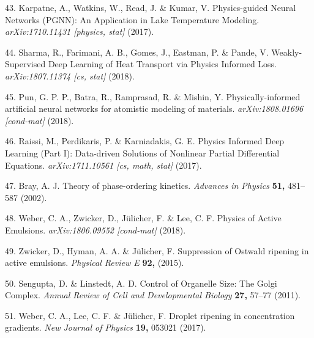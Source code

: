 \documentclass{Dissertate}
\begin{document}
\leavevmode\hypertarget{ref-karpatne_physics-guided_2017}{}%
43. Karpatne, A., Watkins, W., Read, J. \& Kumar, V. Physics-guided
Neural Networks (PGNN): An Application in Lake Temperature Modeling.
\emph{arXiv:1710.11431 {[}physics, stat{]}} (2017).

\leavevmode\hypertarget{ref-sharma_weakly-supervised_2018}{}%
44. Sharma, R., Farimani, A. B., Gomes, J., Eastman, P. \& Pande, V.
Weakly-Supervised Deep Learning of Heat Transport via Physics Informed
Loss. \emph{arXiv:1807.11374 {[}cs, stat{]}} (2018).

\leavevmode\hypertarget{ref-pun_physically-informed_2018}{}%
45. Pun, G. P. P., Batra, R., Ramprasad, R. \& Mishin, Y.
Physically-informed artificial neural networks for atomistic modeling of
materials. \emph{arXiv:1808.01696 {[}cond-mat{]}} (2018).

\leavevmode\hypertarget{ref-raissi_physics_2017-1}{}%
46. Raissi, M., Perdikaris, P. \& Karniadakis, G. E. Physics Informed
Deep Learning (Part I): Data-driven Solutions of Nonlinear Partial
Differential Equations. \emph{arXiv:1711.10561 {[}cs, math, stat{]}}
(2017).

\leavevmode\hypertarget{ref-bray_theory_2002}{}%
47. Bray, A. J. Theory of phase-ordering kinetics. \emph{Advances in
Physics} \textbf{51,} 481--587 (2002).

\leavevmode\hypertarget{ref-weber_physics_2018}{}%
48. Weber, C. A., Zwicker, D., Jülicher, F. \& Lee, C. F. Physics of
Active Emulsions. \emph{arXiv:1806.09552 {[}cond-mat{]}} (2018).

\leavevmode\hypertarget{ref-zwicker_suppression_2015}{}%
49. Zwicker, D., Hyman, A. A. \& Jülicher, F. Suppression of Ostwald
ripening in active emulsions. \emph{Physical Review E} \textbf{92,}
(2015).

\leavevmode\hypertarget{ref-sengupta_control_2011}{}%
50. Sengupta, D. \& Linstedt, A. D. Control of Organelle Size: The Golgi
Complex. \emph{Annual Review of Cell and Developmental Biology}
\textbf{27,} 57--77 (2011).

\leavevmode\hypertarget{ref-weber_droplet_2017}{}%
51. Weber, C. A., Lee, C. F. \& Jülicher, F. Droplet ripening in
concentration gradients. \emph{New Journal of Physics} \textbf{19,}
053021 (2017).
\end{document}
